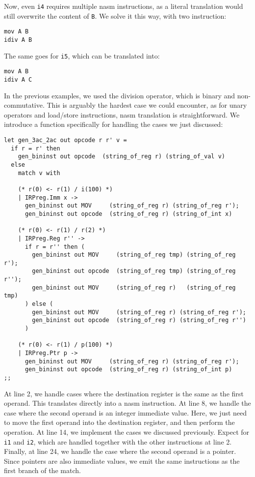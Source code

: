 Now, even \texttt{i4} requires multiple \gls{nasm} instructions, as a literal translation would still overwrite the content of \texttt B. We solve it this way, with two instruction:

\begin{lstlisting}
mov A B
idiv A B
\end{lstlisting}

The same goes for \texttt{i5}, which can be translated into:

\begin{lstlisting}
mov A B
idiv A C
\end{lstlisting}

In the previous examples, we used the division operator, which is binary and non-commutative. This is arguably the hardest case we could encounter, as for unary operators and load/store instructions, \gls{nasm} translation is straightforward.
We introduce a function specifically for handling the cases we just discussed:

\begin{lstlisting}[style=OCaml]
let gen_3ac_2ac out opcode r r' v =
  if r = r' then
    gen_bininst out opcode  (string_of_reg r) (string_of_val v)
  else
    match v with

    (* r(0) <- r(1) / i(100) *)
    | IRPreg.Imm x ->
      gen_bininst out MOV     (string_of_reg r) (string_of_reg r');
      gen_bininst out opcode  (string_of_reg r) (string_of_int x)

    (* r(0) <- r(1) / r(2) *)
    | IRPreg.Reg r'' ->
      if r = r'' then (
        gen_bininst out MOV     (string_of_reg tmp) (string_of_reg r');
        gen_bininst out opcode  (string_of_reg tmp) (string_of_reg r'');
        gen_bininst out MOV     (string_of_reg r)   (string_of_reg tmp)
      ) else (
        gen_bininst out MOV     (string_of_reg r) (string_of_reg r');
        gen_bininst out opcode  (string_of_reg r) (string_of_reg r'')
      )

    (* r(0) <- r(1) / p(100) *)
    | IRPreg.Ptr p ->
      gen_bininst out MOV     (string_of_reg r) (string_of_reg r');
      gen_bininst out opcode  (string_of_reg r) (string_of_int p)
;;
\end{lstlisting}

At line 2, we handle cases where the destination register is the same as the first operand. This translates directly into a \gls{nasm} instruction. At line 8, we handle the case where the second operand is an integer immediate value. Here, we just need to move the first operand into the destination register, and then perform the operation. At line 14, we implement the cases we discussed previously. Expect for \texttt{i1} and \texttt{i2}, which are handled together with the other instructions at line 2. Finally, at line 24, we handle the case where the second operand is a pointer. Since pointers are also immediate values, we emit the same instructions as the first branch of the match.

